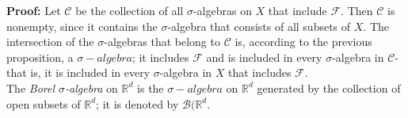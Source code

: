 \documentclass{article}
\begin{document}
\textbf{Proof:} Let \(\mathcal{C}\) be the collection of all \(\sigma\)-algebras on \(X\) that include \(\mathcal{F}\). Then \(\mathcal{C}\) is nonempty, since it contains the \(\sigma\)-algebra that consists of all subsets of \(X\). The intersection of the \(\sigma\)-algebras that belong to \(\mathcal{C}\) is, according to the previous proposition, a \(\sigma-algebra\); it includes \(\mathcal{F}\) and is included in every \(\sigma\)-algebra in \(\mathcal{C}\)- that is, it is included in every \(\sigma\)-algebra in \(X\) that includes \(\mathcal{F}\).\\

The \textit{Borel \(\sigma\)-algebra} on \(\mathbb{R}^d\) is the \(\sigma-algebra\) on \(\mathbb{R}^d\) generated by the collection of open subsets of \(\mathbb{R}^d\); it is denoted by \(\mathcal{B}(\mathbb{R}^d\).
 
\end{document}
